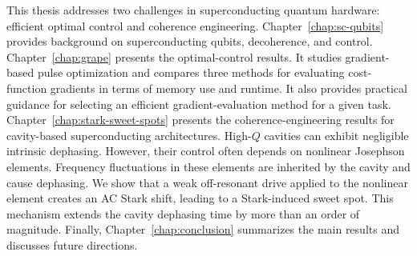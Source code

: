 This thesis addresses two challenges in superconducting quantum hardware: efficient optimal control and coherence engineering. Chapter~\ref{chap:sc-qubits} provides background on superconducting qubits, decoherence, and control. Chapter~\ref{chap:grape} presents the optimal-control results. It studies gradient-based pulse optimization and compares three methods for evaluating cost-function gradients in terms of memory use and runtime. It also provides practical guidance for selecting an efficient gradient-evaluation method for a given task. Chapter~\ref{chap:stark-sweet-spots} presents the coherence-engineering results for cavity-based superconducting architectures. High-$Q$ cavities can exhibit negligible intrinsic dephasing. However, their control often depends on nonlinear Josephson elements. Frequency fluctuations in these elements are inherited by the cavity and cause dephasing. We show that a weak off-resonant drive applied to the nonlinear element creates an AC Stark shift, leading to a Stark-induced sweet spot. This mechanism extends the cavity dephasing time by more than an order of magnitude. Finally, Chapter~\ref{chap:conclusion} summarizes the main results and discusses future directions.